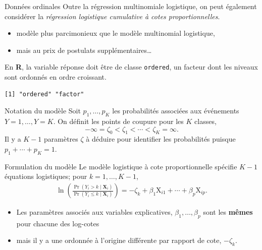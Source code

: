 \documentclass[
  ignorenonframetext,
]{beamer}
\newenvironment{Shaded}{\begin{snugshade}}{\end{snugshade}}
\newcommand{\FunctionTok}[1]{\textcolor[rgb]{0.28,0.35,0.67}{#1}}
\newcommand{\NormalTok}[1]{\textcolor[rgb]{0.00,0.23,0.31}{#1}}
\newcommand{\SpecialCharTok}[1]{\textcolor[rgb]{0.37,0.37,0.37}{#1}}
\providecommand{\tightlist}{%
  \setlength{\itemsep}{0pt}\setlength{\parskip}{0pt}}\usepackage{longtable,booktabs,array}
\begin{document}
\begin{frame}[fragile]{Données ordinales}
\protect\hypertarget{donnuxe9es-ordinales}{}
Outre la régression multinomiale logistique, on peut également
considérer la \emph{régression logistique cumulative à cotes
proportionnelles}.

\begin{itemize}
\tightlist
\item
  modèle plus parcimonieux que le modèle multinomial logistique,
\item
  mais au prix de postulats supplémentaires\ldots{}
\end{itemize}

En \textbf{R}, la variable réponse doit être de classe \texttt{ordered},
un facteur dont les niveaux sont ordonnés en ordre croissant.

\begin{Shaded}
\end{Shaded}

\begin{verbatim}
[1] "ordered" "factor" 
\end{verbatim}
\end{frame}

\begin{frame}{Notation du modèle}
\protect\hypertarget{notation-du-moduxe8le}{}
Soit \(p_1, \ldots, p_K\) les probabilités associées aux événements
\(Y=1, \ldots, Y=K\). On définit les points de coupure pour les \(K\)
classes, \[ -\infty = \zeta_0 < \zeta_1 < \cdots < \zeta_K = \infty.\]
Il y a \(K-1\) paramètres \(\zeta\) à déduire pour identifier les
probabilités puisque \(p_1 + \cdots + p_K=1\).
\end{frame}

\begin{frame}{Formulation du modèle}
\protect\hypertarget{formulation-du-moduxe8le}{}
Le modèle logistique à cote proportionnelle spécifie \(K-1\) équations
logistiques; pour \(k=1, \ldots, K-1\), \begin{align*}
\ln \left(\frac{\Pr(Y_i> k\mid \mathbf{X}_i)}{\Pr(Y_i \le k\mid \mathbf{X}_i)}\right) = -\zeta_k + \beta_1 \mathrm{X}_{i1} + \cdots + \beta_p \mathrm{X}_{ip}.
\end{align*}

\begin{itemize}
\tightlist
\item
  Les paramètres associés aux variables explicatives,
  \(\beta_1, \ldots, \beta_p\) sont les \textbf{mêmes} pour chacune des
  log-cotes
\item
  mais il y a une ordonnée à l'origine différente par rapport de cote,
  \(-\zeta_k\).
\end{itemize}
\end{frame}
\end{document}
